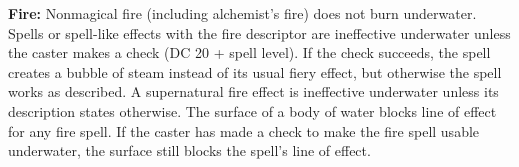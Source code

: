 \textbf{Fire:} Nonmagical fire (including alchemist's fire) does not burn underwater. Spells or spell-like effects with the fire descriptor are ineffective underwater unless the caster makes a  check (DC 20 + spell level). If the check succeeds, the spell creates a bubble of steam instead of its usual fiery effect, but otherwise the spell works as described. A supernatural fire effect is ineffective underwater unless its description states otherwise. The surface of a body of water blocks line of effect for any fire spell. If the caster has made a  check to make the fire spell usable underwater, the surface still blocks the spell's line of effect.
